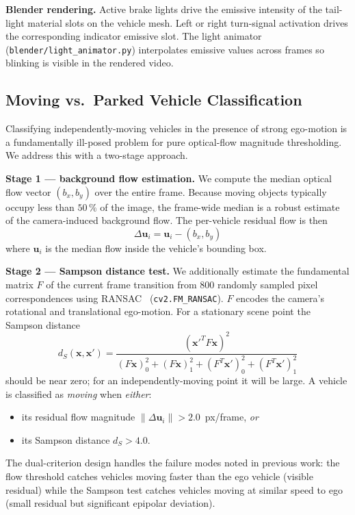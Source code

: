\documentclass[conference]{IEEEtran}
\begin{document}
\textbf{Blender rendering.}
Active brake lights drive the emissive intensity of the tail-light material
slots on the vehicle mesh.  Left or right turn-signal activation drives
the corresponding indicator emissive slot.  The light animator
(\texttt{blender/light\_animator.py}) interpolates emissive values across
frames so blinking is visible in the rendered video.

\subsection{Moving vs.\ Parked Vehicle Classification}

Classifying independently-moving vehicles in the presence of strong
ego-motion is a fundamentally ill-posed problem for pure optical-flow
magnitude thresholding.  We address this with a two-stage approach.

\textbf{Stage 1 — background flow estimation.}
We compute the median optical flow vector $(b_x, b_y)$ over the entire frame.
Because moving objects typically occupy less than $50\,\%$ of the image, the
frame-wide median is a robust estimate of the camera-induced background flow.
The per-vehicle residual flow is then
\begin{equation}
  \Delta\mathbf{u}_i = \mathbf{u}_i - (b_x, b_y)
\end{equation}
where $\mathbf{u}_i$ is the median flow inside the vehicle's bounding box.

\textbf{Stage 2 — Sampson distance test.}
We additionally estimate the fundamental matrix $F$ of the current frame
transition from 800 randomly sampled pixel correspondences using
RANSAC~\cite{hartley2004multiple} (\texttt{cv2.FM\_RANSAC}).  $F$ encodes
the camera's rotational and translational ego-motion.  For a stationary
scene point the Sampson distance
\begin{equation}
  d_S(\mathbf{x}, \mathbf{x}') =
    \frac{(\mathbf{x}'^T F \mathbf{x})^2}
         {(F\mathbf{x})_0^2 + (F\mathbf{x})_1^2 + (F^T\mathbf{x}')_0^2 + (F^T\mathbf{x}')_1^2}
\end{equation}
should be near zero; for an independently-moving point it will be large.
A vehicle is classified as \emph{moving} when \emph{either}:
\begin{itemize}
  \item its residual flow magnitude $\|\Delta\mathbf{u}_i\| > 2.0$~px/frame, \emph{or}
  \item its Sampson distance $d_S > 4.0$.
\end{itemize}
The dual-criterion design handles the failure modes noted in previous work:
the flow threshold catches vehicles moving faster than the ego vehicle
(visible residual) while the Sampson test catches vehicles moving at similar
speed to ego (small residual but significant epipolar deviation).
\end{document}
